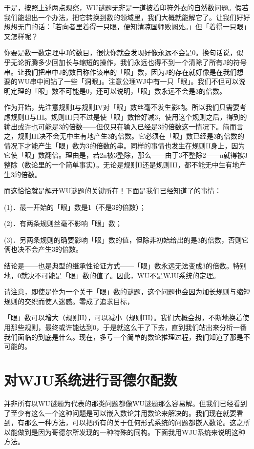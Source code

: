 \documentclass[
  12pt,
  twoside,
  openright,
  oldfontcommands,
]{memoir}
\begin{document}
于是，按照上述两点观察，WU谜题无非是一道披着印符外衣的自然数问题。假若我们能想出一个办法，把它转换到数的领域里，我们大概就能解它了。让我们好好想想无门的话：「若向者里着得一只眼，便知清凉国师败阙处。」但「着得一只眼」又怎样呢？

你要是数一数定理中J的数目，很快你就会发现好像永远不会是0。换句话说，似乎无论折腾多少回加长与缩短的操作，我们永远也得不到一个清除了所有J的符号串。让我们把串中J的数目称作该串的「眼」数，因为J的存在就好像是在我们想要的WU串中间钻了一些「洞眼」。注意公理WJ中有一只「眼」。我们不但可以说明定理的「眼」数不可能是0，还可以说明，「眼」数永远不会是3的倍数。

作为开始，先注意规则I与规则IV对「眼」数丝毫不发生影响。所以我们只需要考虑规则II与III。规则III只不过是使「眼」数恰好减3，使用这个规则之后，得到的输出或许也可能是3的倍数------但仅只在输入已经是3的倍数这一情况下。简而言之，规则III决不会无中生有地产生3的倍数。它必须在「眼」数已经是3的倍数的情况下才能产生「眼」数为3的倍数的串。同样的事情也发生在规则II身上，因为它使「眼」数翻倍。理由是，若2n被3整除，那么------由于3不整除2------n就得被3整除（数论里的一个简单事实）。无论是规则II还是规则III，都不能无中生有地产生3的倍数。

而这恰恰就是解开WU谜题的关键所在！下面是我们已经知道了的事情：

(1)．最一开始的「眼」数是1（不是3的倍数）；

(2)．有两条规则丝毫不影响「眼」数；

(3)．另两条规则的确要影响「眼」数的值，但除非初始给出的是3的倍数，否则它俩也决不会产生3的倍数。

结论是------也是典型的继承性论证方式------「眼」数永远无法变成3的倍数。特别地，0就决不可能是「眼」数的值了。因此，WU不是WJU系统的定理。

请注意，即使是作为一个关于「眼」数的谜题，这个问题也会因为加长规则与缩短规则的交织而使人迷惑。零成了追求目标，

「眼」数可以增大（规则II），可以减小（规则III）。我们大概会想，不断地换着使用那些规则，最终或许能达到0，于是就这么干了下去，直到我们站出来分析一番我们面临的到底是什么。现在，多亏一个简单的数论推理过程，我们知道了那是不可能的。

\section{对WJU系统进行哥德尔配数}

并非所有以WU谜题为代表的那类问题都像WU谜题那么容易解。但我们已经看到了至少有这么一个这种问题是可以嵌入数论并用数论来解决的。我们现在就要看到，有那么一种方法，可以把所有的关于任何形式系统的问题都嵌入数论。这之所以能做到是因为哥德尔所发现的一种特殊的同构。下面我用WJU系统来说明这种方法。
\end{document}
